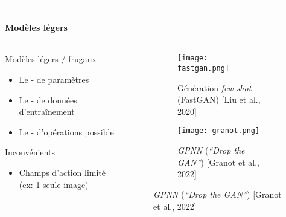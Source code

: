 \documentclass[aspectratio=169, 22pt]{beamer}
\begin{document}
\begin{frame}{\secname~- \subsecname}
  \framesubtitle{Modèles légers}
  \begin{columns}
    \begin{column}{0.5\linewidth}
      \begin{customblock}{Modèles légers / frugaux}        
        \begin{itemize}
        \item \small Le - de paramètres
        \item \small Le - de données d'entraînement
        \item \small Le - d'opérations possible
        \end{itemize}
      \end{customblock}
      \begin{alertblock}{Inconvénients}
        \begin{itemize}
        \item \small Champs d'action limité (ex: 1 seule image)
        \end{itemize}
      \end{alertblock}
    \end{column}
    \begin{column}{0.5\linewidth}
      \begin{figure}
        \centering
        \begin{subfigure}{0.45\linewidth}
          \centering
          \texttt{[image: fastgan.png]}
          \caption{Génération \emph{few-shot} (FastGAN) [Liu et al., 2020]}
        \end{subfigure}
        
        \begin{subfigure}{\linewidth}
          \centering
          \texttt{[image: granot.png]}
          \caption{\emph{GPNN} (\emph{``Drop the GAN''}) [Granot et al., 2022]}
        \end{subfigure}
      \end{figure}
    \end{column}
  \end{columns}  
\end{frame}
\end{document}
